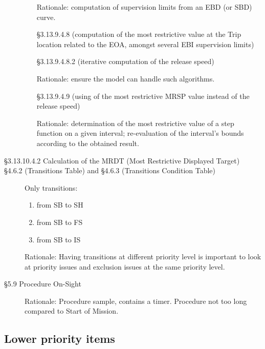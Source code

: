 \documentclass{template/openetcs_article}
\begin{document}
\begin{description}
\begin{itemize}
		Rationale: computation of supervision limits from an EBD (or SBD) curve.

  \item[§3.13.9.4.8] (computation of the most restrictive value at the
    Trip location related to the EOA, amongst several EBI supervision
    limits)

    \item[§3.13.9.4.8.2] (iterative computation of the release speed)

		Rationale: ensure the model can handle such algorithms.

    \item[§3.13.9.4.9] (using of the most restrictive MRSP value
      instead of the release speed)
			
			Rationale: determination of the most restrictive value of a step function on a given interval; re-evaluation of the interval’s bounds according to the obtained result.
			
  \end{itemize}

\item[§3.13.10.4.2 Calculation of the MRDT (Most Restrictive Displayed Target)]

\item [§4.6.2 (Transitions Table) and §4.6.3 (Transitions Condition
  Table)] Only transitions:
  \begin{enumerate}
  \item from SB to SH
  \item from SB to FS
  \item from SB to IS
  \end{enumerate}

  Rationale: Having transitions at different priority level is
  important to look at priority issues and exclusion issues at the
  same priority level.

\item [§5.9 Procedure On-Sight]

 Rationale: Procedure sample, contains a timer. Procedure not too long
 compared to Start of Mission.

\end{description}

\subsection{Lower priority items}
\end{document}
